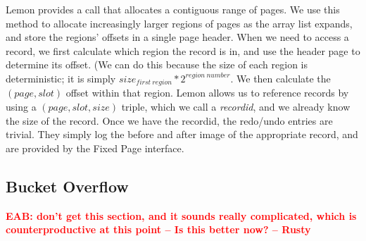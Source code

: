 \documentclass[letterpaper,twocolumn,english]{article}
\newcommand{\yad}{Lemon\xspace}
\newcommand{\eab}[1]{\textcolor{red}{\bf EAB: #1}}
\begin{document}
\yad provides a call that allocates a contiguous range of pages.  We
use this method to allocate increasingly larger regions of pages as
the array list expands, and store the regions' offsets in a single 
page header.  When we need to access a record, we first calculate 
which region the record is in, and use the header page to determine 
its offset.  (We can do this because the size of each region is 
deterministic; it is simply $size_{first~region} * 2^{region~number}$.  
We then calculate the $(page,slot)$ offset within that region.  \yad 
allows us to reference records by using a $(page,slot,size)$ triple, 
which we call a {\em recordid}, and we already know the size of the 
record.  Once we have the recordid, the redo/undo entries are trivial.  
They simply log the before and after image of the appropriate record, 
and are provided by the Fixed Page interface.

%



\subsection{Bucket Overflow}

\eab{don't get this section, and it sounds really complicated, which is counterproductive at this point  -- Is this better now? -- Rusty}
\end{document}
